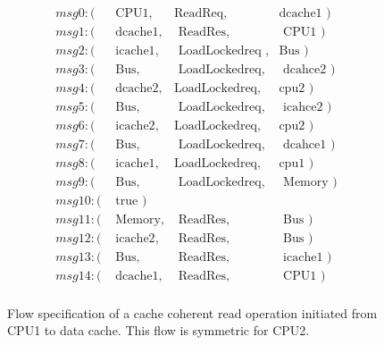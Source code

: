 \documentclass[conference]{IEEEtran}
\begin{document}
\begin{figure}
 {\footnotesize
 \[
 \begin{array}{llll}
 msg0: (&\mbox{ CPU1},&\mbox{ReadReq},&\mbox{dcache1  })\\                   
 msg1: (&\mbox{ dcache1},&\mbox{ ReadRes},&\mbox{ CPU1 })\\
 msg2: (&\mbox{ icache1},&\mbox{ LoadLockedreq },&\mbox{Bus })\\     
 msg3: (&\mbox{ Bus},&\mbox{ LoadLockedreq},&\mbox{ dcahce2     })\\
 msg4: (&\mbox{ dcache2},&\mbox{LoadLockedreq},&\mbox{cpu2 })\\
 msg5: (&\mbox{ Bus},&\mbox{ LoadLockedreq},&\mbox{ icahce2     })\\ 
 msg6: (&\mbox{ icache2},&\mbox{LoadLockedreq},&\mbox{cpu2     })\\
 msg7: (&\mbox{ Bus},&\mbox{ LoadLockedreq},&\mbox{ dcahce1 })\\
 msg8: (&\mbox{ icache1},&\mbox{LoadLockedreq},&\mbox{cpu1       })\\
 msg9: (&\mbox{ Bus},&\mbox{ LoadLockedreq},&\mbox{ Memory     })\\
 msg10: (&\mbox{ true })\\
 msg11: (&\mbox{ Memory},&\mbox{ ReadRes},&\mbox{ Bus       })\\     
 msg12: (&\mbox{ icache2},&\mbox{ ReadRes},&\mbox{ Bus    })\\
 msg13: (&\mbox{ Bus},&\mbox{ ReadRes},&\mbox{ icache1 })\\
 msg14: (&\mbox{ dcache1},&\mbox{ ReadRes},&\mbox{ CPU1 })\\
 \end{array}
 \]}
 \caption{Flow specification of a cache coherent read operation initiated from CPU1 to  data cache. This flow is symmetric for CPU2. }
 \label{read-dcache}
 
 \end{figure}
\end{document}
